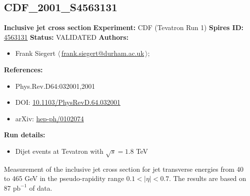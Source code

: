 \subsection{CDF\_2001\_S4563131}
\textbf{Inclusive jet cross section}\newline
\textbf{Experiment:} CDF (Tevatron Run 1) \newline
\textbf{Spires ID:} \href{http://www.slac.stanford.edu/spires/find/hep/www?rawcmd=key+4563131}{4563131}\newline
\textbf{Status:} VALIDATED\newline
\textbf{Authors:}
\begin{itemize}
  \item Frank Siegert $\langle\,$\href{mailto:frank.siegert@durham.ac.uk}{frank.siegert@durham.ac.uk}$\,\rangle$;
\end{itemize}
\textbf{References:}
\begin{itemize}
  \item Phys.Rev.D64:032001,2001
  \item DOI: \href{http://dx.doi.org/10.1103/PhysRevD.64.032001}{10.1103/PhysRevD.64.032001}
  \item arXiv: \href{http://arxiv.org/abs/hep-ph/0102074}{hep-ph/0102074}
\end{itemize}
\textbf{Run details:}
\begin{itemize}

  \item Dijet events at Tevatron with $\sqrt{s}=1.8$ TeV\end{itemize}

\noindent Measurement of the inclusive jet cross section for jet transverse energies from 40 to 465 GeV in the pseudo-rapidity range $0.1<|\eta|<0.7$. The results are based on 87 $\mathrm{pb}^{-1}$ of data.

\clearpage


\clearpage

